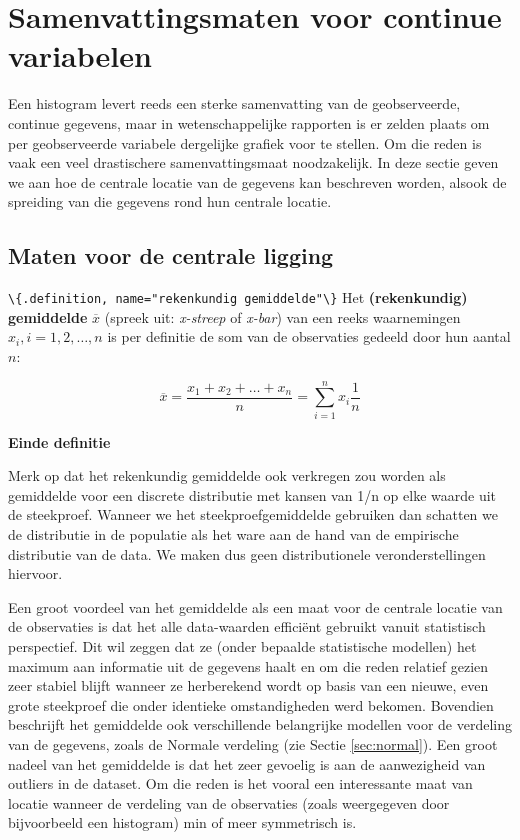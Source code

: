 \documentclass[
  12pt,dutch,coursenotes]{book}
\newcommand{\passthrough}[1]{#1}
\begin{document}
\hypertarget{sec:summarize}{%
\section{Samenvattingsmaten voor continue variabelen}\label{sec:summarize}}

Een histogram levert reeds een sterke samenvatting van de geobserveerde,
continue gegevens, maar in wetenschappelijke rapporten is er zelden
plaats om per geobserveerde variabele dergelijke grafiek voor te stellen. Om
die reden is vaak een veel drastischere samenvattingsmaat noodzakelijk. In deze
sectie geven we aan hoe de centrale locatie van de gegevens kan beschreven
worden, alsook de spreiding van die gegevens rond hun centrale locatie.

\hypertarget{maten-voor-de-centrale-ligging}{%
\subsection{Maten voor de centrale ligging}\label{maten-voor-de-centrale-ligging}}

\passthrough{\lstinline!\{.definition, name="rekenkundig gemiddelde"\}!}
Het \textbf{(rekenkundig) gemiddelde} \(\overline{x}\) (spreek uit: \emph{x-streep}
of \emph{x-bar}) van een reeks waarnemingen \(x_i, i=1, 2, \dots, n\) is per
definitie de som van de observaties gedeeld door hun aantal \(n\):

\[\overline{x}= \frac{x_1 + x_2 + \dots + x_n}{n} =\sum_{i=1}^n x_i \frac{1}{n} \]

\textbf{Einde definitie}

Merk op dat het rekenkundig gemiddelde ook verkregen zou worden als gemiddelde voor een discrete distributie met kansen van 1/n op elke waarde uit de steekproef.
Wanneer we het steekproefgemiddelde gebruiken dan schatten we de distributie in de populatie als het ware aan de hand van de empirische distributie van de data. We maken dus geen distributionele veronderstellingen hiervoor.

Een groot voordeel van het gemiddelde als een maat voor de centrale locatie
van de observaties is dat het alle data-waarden efficiënt gebruikt vanuit
statistisch perspectief. Dit wil zeggen dat ze (onder bepaalde statistische modellen)
het maximum aan informatie
uit de gegevens haalt en om die reden relatief gezien zeer stabiel blijft
wanneer ze herberekend wordt op basis van een nieuwe, even grote steekproef
die onder identieke omstandigheden werd bekomen. Bovendien beschrijft het
gemiddelde ook verschillende belangrijke modellen voor de verdeling van de
gegevens, zoals de Normale verdeling (zie Sectie \ref{sec:normal}). Een
groot nadeel van het gemiddelde is dat het zeer gevoelig is aan de
aanwezigheid van outliers in de dataset. Om die reden is het vooral een
interessante maat van locatie wanneer de verdeling van de observaties (zoals
weergegeven door bijvoorbeeld een histogram) min of meer symmetrisch is.
\end{document}

